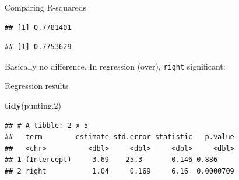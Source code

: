 \documentclass[
  ignorenonframetext,
]{beamer}
\newenvironment{Shaded}{\begin{snugshade}}{\end{snugshade}}
\newcommand{\FloatTok}[1]{\textcolor[rgb]{0.00,0.00,0.81}{#1}}
\newcommand{\KeywordTok}[1]{\textcolor[rgb]{0.13,0.29,0.53}{\textbf{#1}}}
\newcommand{\NormalTok}[1]{#1}
\newcommand{\OperatorTok}[1]{\textcolor[rgb]{0.81,0.36,0.00}{\textbf{#1}}}
\begin{document}
\begin{frame}[fragile]{Comparing R-squareds}
\protect\hypertarget{comparing-r-squareds}{}

\begin{Shaded}
\end{Shaded}

\begin{verbatim}
## [1] 0.7781401
\end{verbatim}

\begin{Shaded}
\end{Shaded}

\begin{verbatim}
## [1] 0.7753629
\end{verbatim}

Basically no difference. In regression (over), \texttt{right}
significant:

\end{frame}

\begin{frame}[fragile]{Regression results}
\protect\hypertarget{regression-results}{}

\begin{Shaded}
\begin{Highlighting}[]
\KeywordTok{tidy}\NormalTok{(punting}\FloatTok{.2}\NormalTok{)}
\end{Highlighting}
\end{Shaded}

\begin{verbatim}
## # A tibble: 2 x 5
##   term        estimate std.error statistic   p.value
##   <chr>          <dbl>     <dbl>     <dbl>     <dbl>
## 1 (Intercept)    -3.69    25.3      -0.146 0.886    
## 2 right           1.04     0.169     6.16  0.0000709
\end{verbatim}

\end{frame}
\end{document}
